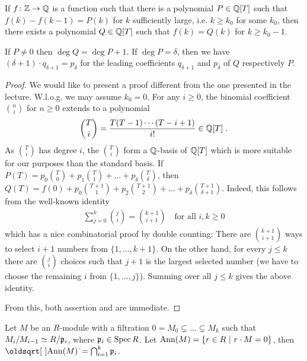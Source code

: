 \documentclass[a4paper,parskip=half,numbers=enddot, DIV=12]{scrreprt}
\begin{document}
\begin{fact}
    \begin{alphanumerate}
    \item {}
        If $f\colon \IZ\morphism \IQ$ is a function such that there is a polynomial $P\in\mathbb{Q}[T]$ such that $f(k) -f(k-1) = P(k)$ for $k$ sufficiently large, i.e. $k\geq k_0$ for some $k_0$, then there exists a polynomial $Q\in\mathbb{Q}[T]$ such that $f(k) = Q(k)$ for $k\geq k_0-1$. 
    \item 
        If $P\neq 0$ then $\deg Q = \deg P +1$. If $\deg P = \delta$, then we have $(\delta+1) \cdot q_{\delta+1} = p_\delta$ for the leading coefficients $q_{\delta+1}$ and $p_\delta$ of $Q$ respectively $P$. 
    \end{alphanumerate}
\end{fact}
\begin{proof}
	We would like to present a proof different from the one presented in the lecture. W.l.o.g. we may assume $k_0=0$. For any $i\geq0$, the binomial coefficient $\binom{n}{i}$ for $n\geq0$ extends to a polynomial 
	\begin{align*}
		\binom{T}{i}=\frac{T(T-1)\cdots(T-i+1)}{i!}\in\mathbb{Q}[T]\;.
	\end{align*}
	As $\binom{T}{i}$ has degree $i$, the $\binom{T}{i}$ form a $\mathbb{Q}$-basis of $\mathbb{Q}[T]$ which is more suitable for our purposes than the standard basis. If $P(T)=p_0\binom{T}{0}+p_1\binom{T}{1}+\ldots+p_\delta \binom{T}{\delta}$, then $Q(T)=f(0)+p_0\binom{T+1}{1}+p_2\binom{T+1}{2}+\ldots+p_\delta\binom{T+1}{\delta+1}$. Indeed, this follows from the well-known identity
	\begin{align*}
		\sum_{j=0}^{k}\binom{j}{i}=\binom{k+1}{i+1}\quad\text{for all }i,k\geq 0
	\end{align*}
	which has a nice combinatorial proof by double counting: There are $\binom{k+1}{i+1}$ ways to select $i+1$ numbers from $\{1,\ldots,k+1\}$. On the other hand, for every $j\leq k$ there are $\binom{j}{i}$ choices such that $j+1$ is the largest selected number (we have to choose the remaining $i$ from $\{1,\ldots,j\}$). Summing over all $j\leq k$ gives the above identity.
	
	From this, both assertion  and  are immediate.
\end{proof}
\begin{fact}
    Let $M$ be an $R$-module with a filtration $0=M_0\subsetneq \ldots \subsetneq M_k$ such that $M_i/M_{i-1}\simeq R/\mathfrak{p}_i$, where $\mathfrak{p}_i \in \operatorname{Spec} R$. Let $\operatorname{Ann}(M) = \left\{r\in R\ \middle|\  r\cdot M = 0\right\}$, then $\sqrt{\Ann(M)} = \bigcap_{i=1}^k\pp_i$.
\end{fact}
\end{document}
